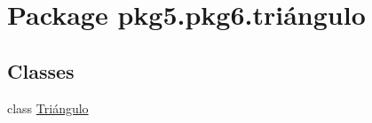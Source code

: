 \hypertarget{namespacepkg5_1_1pkg6_1_1tri_xC3_xA1ngulo}{}\section{Package pkg5.\+pkg6.\+triángulo}
\label{namespacepkg5_1_1pkg6_1_1tri_xC3_xA1ngulo}
\subsection*{Classes}
\begin{DoxyCompactItemize}
\item 
class \mbox{\hyperlink{classpkg5_1_1pkg6_1_1tri_xC3_xA1ngulo_1_1_tri_xC3_xA1ngulo}{Triángulo}}
\end{DoxyCompactItemize}
